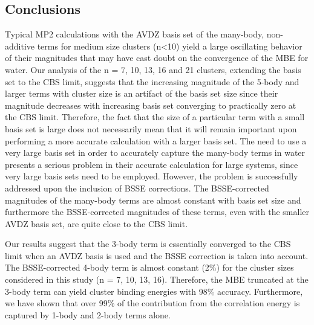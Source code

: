 \documentclass[11pt, proquest]{uwthesis}[2020/02/24]
\newcommand{\textapprox}{\raisebox{0.5ex}{\texttildelow}}
\begin{document}
\subsection{Conclusions}

\par Typical MP2 calculations with the AVDZ basis set of the many-body, non-additive terms for medium size clusters (n\textless 10) yield a large oscillating behavior of their magnitudes that may have cast doubt on the convergence of the MBE for water. Our analysis of the n = 7, 10, 13, 16 and 21 clusters, extending the basis set to the CBS limit, suggests that the increasing magnitude of the 5-body and larger terms with cluster size is an artifact of the basis set size since their magnitude decreases with increasing basis set converging to practically zero at the CBS limit. Therefore, the fact that the size of a particular term with a small basis set is large does not necessarily mean that it will remain important upon performing a more accurate calculation with a larger basis set. The need to use a very large basis set in order to accurately capture the many-body terms in water presents a serious problem in their accurate calculation for large systems, since very large basis sets need to be employed. However, the problem is successfully addressed upon the inclusion of BSSE corrections. The BSSE-corrected magnitudes of the many-body terms are almost constant with basis set size and furthermore the BSSE-corrected magnitudes of these terms, even with the smaller AVDZ basis set, are quite close to the CBS limit. 

\par Our results suggest that the 3-body term is essentially converged to the CBS limit when an AVDZ basis is used and the BSSE correction is taken into account. The BSSE-corrected 4-body term is almost constant (\textapprox2\%) for the cluster sizes considered in this study (n = 7, 10, 13, 16). Therefore, the MBE truncated at the 3-body term can yield cluster binding energies with \textapprox98\% accuracy. Furthermore, we have shown that over 99\% of the contribution from the correlation energy is captured by 1-body and 2-body terms alone.
\end{document}
